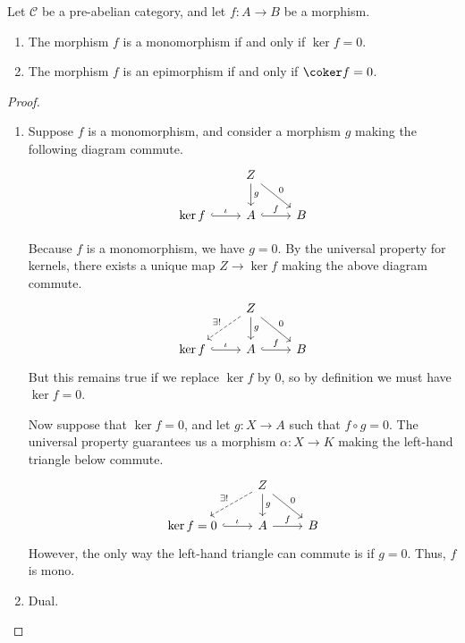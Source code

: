 \documentclass[main.tex]{subfiles}
\begin{document}
\begin{proposition}
  \label{prop:kernels_and_cokernels_of_monos_and_epis_in_pre_abelian_categories}
  Let $\mathcal{C}$ be a pre-abelian category, and let $f\colon A \to B$ be a morphism.
  \begin{enumerate}
    \item The morphism $f$ is a monomorphism if and only if $\ker f = 0$.

    \item The morphism $f$ is an epimorphism if and only if $\coker f = 0$.
  \end{enumerate}
\end{proposition}
\begin{proof}
  \leavevmode
  \begin{enumerate}
    \item Suppose $f$ is a monomorphism, and consider a morphism $g$ making the following diagram commute.
      \begin{equation*}
        \begin{tikzcd}
          & Z
          \arrow[d, "g"]
          \arrow[dr, "0"]
          \\
          \ker f
          \arrow[r, hook, "\iota"]
          & A
          \arrow[r, hook, "f"]
          & B
        \end{tikzcd}
      \end{equation*}

      Because $f$ is a monomorphism, we have $g = 0$. By the universal property for kernels, there exists a unique map $Z \to \ker f$ making the above diagram commute.
      \begin{equation*}
        \begin{tikzcd}
          & Z
          \arrow[d, "g"]
          \arrow[dr, "0"]
          \arrow[dl, dashed, swap, "\exists!"]
          \\
          \ker f
          \arrow[r, hook, "\iota"]
          & A
          \arrow[r, hook, "f"]
          & B
        \end{tikzcd}
      \end{equation*}
      But this remains true if we replace $\ker f$ by $0$, so by definition we must have $\ker f = 0$.

      Now suppose that $\ker f = 0$, and let $g\colon X \to A$ such that $f \circ g = 0$. The universal property guarantees us a morphism $\alpha\colon X \to K$ making the left-hand triangle below commute.
      \begin{equation*}
        \begin{tikzcd}
          & Z
          \arrow[d, "g"]
          \arrow[dr, "0"]
          \arrow[dl, dashed, swap, "\exists!"]
          \\
          \ker f = 0
          \arrow[r, hook, "\iota"]
          & A
          \arrow[r, "f"]
          & B
        \end{tikzcd}
      \end{equation*}
      However, the only way the left-hand triangle can commute is if $g = 0$. Thus, $f$ is mono.

    \item Dual.
  \end{enumerate}
\end{proof}
\end{document}

